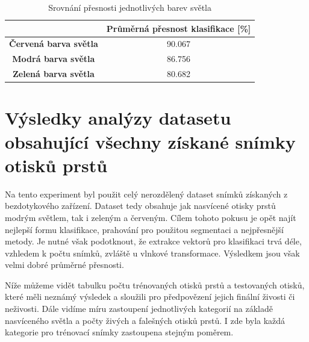 \capstartfalse
\begin{table}[!htbp]
\centering
\begin{tabular}{|c|c|}
\hline
                              & \textbf{Průměrná přesnost klasifikace {[}\%{]}} \\ \hline
\textbf{Červená barva světla} & 90.067                                         \\ \hline
\textbf{Modrá barva světla}   & 86.756                                         \\ \hline
\textbf{Zelená barva světla}  & 80.682                                        \\ \hline
\end{tabular}
\caption{Srovnání přesnosti jednotlivých barev světla}
\end{table}
\capstarttrue

\section{Výsledky analýzy datasetu obsahující všechny získané snímky otisků prstů}
Na tento experiment byl použit celý nerozdělený dataset snímků získaných z bezdotykového zařízení. Dataset tedy obsahuje jak nasvícené otisky prstů modrým světlem, tak i zeleným a červeným. Cílem tohoto pokusu je opět najít nejlepší formu klasifikace, prahování pro použitou segmentaci a nejpřesnější metody. Je nutné však podotknout, že extrakce vektorů pro klasifikaci trvá déle, vzhledem k počtu snímků, zvláště u vlnkové transformace. Výsledkem jsou však velmi dobré průměrné přesnosti. 

Níže můžeme vidět tabulku počtu trénovaných otisků prstů a testovaných otisků, které měli neznámý výsledek a sloužili pro předpovězení jejich finální živosti či neživosti. Dále vidíme míru zastoupení jednotlivých kategorií na základě nasvíceného světla a počty živých a falešných otisků prstů. I zde byla každá kategorie pro trénovací snímky zastoupena stejným poměrem.

